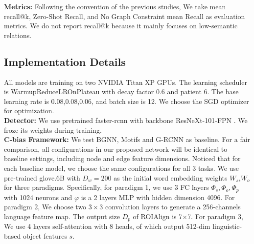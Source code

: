 \documentclass[runningheads]{llncs}
\begin{document}
\noindent\textbf{Metrics:} Following the convention of the previous studies, We
take mean  recall@k, Zero-Shot Recall\cite{lp}, and No Graph Constraint mean
Recall\cite{pixels} as evaluation metrics. We do not report
recall@k\cite{vctree} because it mainly focuses on low-semantic relations.
\subsection{Implementation Details}
All models are training on two NVIDIA Titan XP GPUs. The learning scheduler is
WarmupReduceLROnPlateau with decay factor 0.6 and patient 6. The base learning
rate is 0.08,0.08,0.06, and batch size is 12. We choose the SGD optimizer for
optimization.\\

\noindent\textbf{Detector:} We use pretrained faster-rcnn\cite{rcnn}  with
backbone ResNeXt-101-FPN\cite{maskrcnn} . We froze its weights during training.
\\

\noindent\textbf{C-bias Framework:} We test BGNN\cite{bgnn}, Motifs\cite{motif}
and G-RCNN\cite{grcnn} as baseline. For a fair comparison, all configurations
in our proposed network will be identical to baseline settings, including node
and edge feature dimensions. Noticed that for each baseline model, we choose
the same configurations for all 3 tasks. We use pre-trained
glove.6B\cite{glove} with $D_{w}=200$ as the initial word embedding weights
$W_{s}$,$W_{o}$ for three paradigms.
Specifically, for paradigm 1, we use 3 FC layers $\Phi_{s},\Phi_{o},\Phi_{p}$
with 1024 neurons and $\varphi$ is a 2 layers MLP with hidden dimension 4096.
For paradigm 2, We choose two $3\times3$ convolution layers to generate a
256-channels language feature map. The output size $D_{p}$ of
ROIAlign\cite{maskrcnn} is 7$\times$7. For paradigm 3, We use 4 layers
self-attention with 8 heads, of which output 512-dim linguistic-based object
features $s$.
\end{document}
